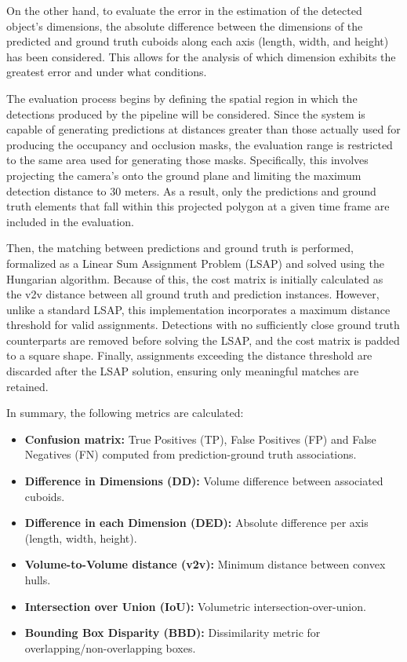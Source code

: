 On the other hand, to evaluate the error in the estimation of the detected object's dimensions, the absolute difference between the dimensions of the predicted and ground truth cuboids along each axis (length, width, and height) has been considered. This allows for the analysis of which dimension exhibits the greatest error and under what conditions.

The evaluation process begins by defining the spatial region in which the detections produced by the pipeline will be considered. Since the system is capable of generating predictions at distances greater than those actually used for producing the  occupancy and occlusion masks, the evaluation range is restricted to the same area used for generating those masks. Specifically, this involves projecting the camera's  onto the ground plane and limiting the maximum detection distance to $30$ meters. As a result, only the predictions and ground truth elements that fall within this projected polygon at a given time frame are included in the evaluation.

Then, the matching between predictions and ground truth is performed, formalized as a Linear Sum Assignment Problem (LSAP) and solved using the Hungarian algorithm. Because of this, the cost matrix is initially calculated as the v2v distance between all ground truth and prediction instances.  However, unlike a standard LSAP, this implementation incorporates a maximum distance threshold for valid assignments. Detections with no sufficiently close ground truth counterparts are removed before solving the LSAP, and the cost matrix is padded to a square shape. Finally, assignments exceeding the distance threshold are discarded after the LSAP solution, ensuring only meaningful matches are retained. 

In summary, the following metrics are calculated:
\begin{itemize}
    \item \textbf{Confusion matrix:} True Positives (TP), False Positives (FP) and False Negatives (FN) computed from prediction-ground truth associations.
    \item \textbf{Difference in Dimensions (DD):} Volume difference between associated cuboids.
    \item \textbf{Difference in each Dimension (DED):} Absolute difference per axis (length, width, height).  
    \item \textbf{Volume-to-Volume distance (v2v):} Minimum distance between convex hulls.
    \item \textbf{Intersection over Union (IoU):} Volumetric intersection-over-union.
    \item \textbf{Bounding Box Disparity (BBD):} Dissimilarity metric for overlapping/non-overlapping boxes.
\end{itemize}


